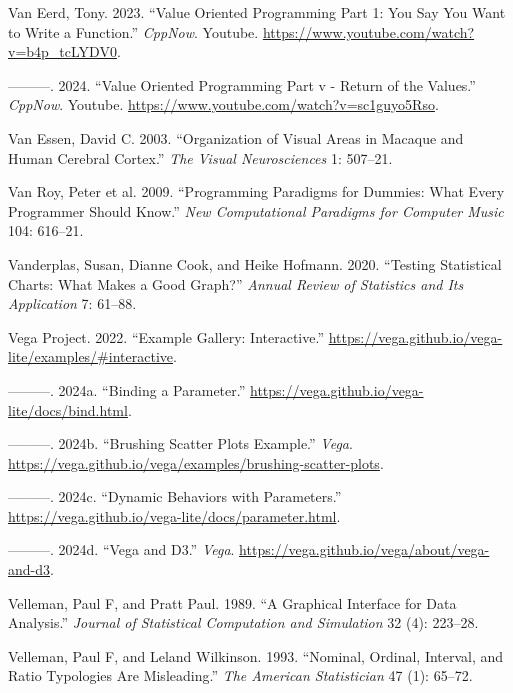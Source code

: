 \documentclass[
  openany]{book}
\newlength{\cslhangindent}
\newenvironment{CSLReferences}[2] %
 {\begin{list}{}{%
  \setlength{\itemindent}{0pt}
  \setlength{\leftmargin}{0pt}
  \setlength{\parsep}{0pt}
  \ifodd #1
   \setlength{\leftmargin}{\cslhangindent}
   \setlength{\itemindent}{-1\cslhangindent}
  \fi
  \setlength{\itemsep}{#2\baselineskip}}}
 {\end{list}}
\theoremstyle{definition}
\theoremstyle{definition}
\theoremstyle{definition}
\theoremstyle{definition}
\theoremstyle{remark}
\begin{document}
\begin{CSLReferences}{1}{0}
Van Eerd, Tony. 2023. {``Value Oriented Programming Part 1: You Say You Want to Write a Function.''} \emph{CppNow}. Youtube. \url{https://www.youtube.com/watch?v=b4p_tcLYDV0}.

---------. 2024. {``Value Oriented Programming Part v - Return of the Values.''} \emph{CppNow}. Youtube. \url{https://www.youtube.com/watch?v=sc1guyo5Rso}.

Van Essen, David C. 2003. {``Organization of Visual Areas in Macaque and Human Cerebral Cortex.''} \emph{The Visual Neurosciences} 1: 507--21.

Van Roy, Peter et al. 2009. {``Programming Paradigms for Dummies: What Every Programmer Should Know.''} \emph{New Computational Paradigms for Computer Music} 104: 616--21.

Vanderplas, Susan, Dianne Cook, and Heike Hofmann. 2020. {``Testing Statistical Charts: What Makes a Good Graph?''} \emph{Annual Review of Statistics and Its Application} 7: 61--88.

Vega Project. 2022. {``{Example Gallery: Interactive}.''} \url{https://vega.github.io/vega-lite/examples/\#interactive}.

---------. 2024a. {``{Binding a Parameter}.''} \url{https://vega.github.io/vega-lite/docs/bind.html}.

---------. 2024b. {``Brushing Scatter Plots Example.''} \emph{Vega}. \url{https://vega.github.io/vega/examples/brushing-scatter-plots}.

---------. 2024c. {``{Dynamic Behaviors with Parameters}.''} \url{https://vega.github.io/vega-lite/docs/parameter.html}.

---------. 2024d. {``Vega and D3.''} \emph{Vega}. \url{https://vega.github.io/vega/about/vega-and-d3}.

Velleman, Paul F, and Pratt Paul. 1989. {``A Graphical Interface for Data Analysis.''} \emph{Journal of Statistical Computation and Simulation} 32 (4): 223--28.

Velleman, Paul F, and Leland Wilkinson. 1993. {``Nominal, Ordinal, Interval, and Ratio Typologies Are Misleading.''} \emph{The American Statistician} 47 (1): 65--72.


\end{CSLReferences}
\end{document}
